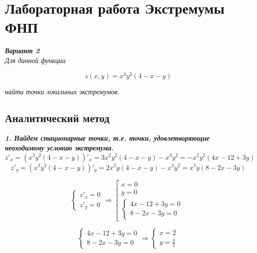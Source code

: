\documentclass[a5paper, 10pt]{article}
\theoremstyle{definition}
\theoremstyle{plain}
\theoremstyle{remark}
\begin{document}
\newpage

\section{Лабораторная работа Экстремумы ФНП}
\textit{\textbf{Вариант 2}}\\

\textit{Для данной функции}

$$z(x,y) = x^3y^2(4-x-y)$$

\textit{найти точки локальных экстремумов.}\\

\subsection{Аналитический метод}


\textit{\textbf{1. Найдем стационарные точки, т.е. точки, удовлетворяющие неоходимому условию экстремума.}}\\
\begin{equation}
z'_x = \left( x^3y^2(4-x-y)  \right)'_x = 3x^2y^2(4-x-y) - x^3y^2 = -x^2y^2 (4x - 12+3y)
\end{equation}
\begin{equation}
z'_y = \left( x^3y^2(4-x-y)  \right)'_y = 2x^3y(4-x-y) - x^3y^2 = x^3y(8-2x-3y)
\end{equation}

\begin{equation}
\begin{cases}
z'_x = 0\\
z'_y = 0
\end{cases}
\Rightarrow
\left[
\begin{array}{c}
x = 0\\
y = 0\\
\begin{cases}
4x - 12+3y= 0\\
8-2x-3y = 0
\end{cases}
\end{array}
\right.
\end{equation}


\begin{equation}
\begin{cases}
4x - 12+3y= 0\\
8-2x-3y = 0
\end{cases}
\Rightarrow
\begin{cases}
x = 2\\
y = \frac{4}{3} 
\end{cases}
\end{equation}
\end{document}
